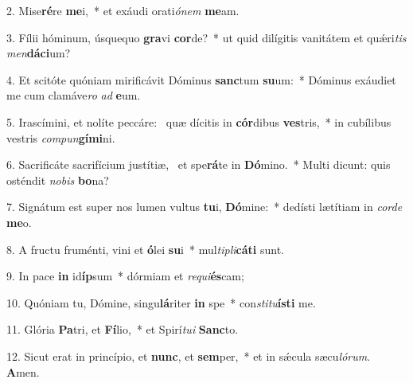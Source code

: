 2. Mise\textbf{ré}re \textbf{me}i,~*  et exáudi orati\textit{ó}\textit{nem} \textbf{me}am.\

3. Fílii hóminum, úsquequo \textbf{gra}vi \textbf{cor}de?~*  ut quid dilígitis vanitátem et quǽri\textit{tis} \textit{men}\textbf{dá}\textbf{ci}um?\

4. Et scitóte quóniam mirificávit Dóminus \textbf{sanc}tum \textbf{su}um:~*  Dóminus exáudiet me cum clamáve\textit{ro} \textit{ad} \textbf{e}um.\

5. Irascímini, et nolíte peccáre: \dag\  quæ dícitis in \textbf{cór}dibus \textbf{ves}tris,~*  in cubílibus vestris \textit{com}\textit{pun}\textbf{gí}\textbf{mi}ni.\

6. Sacrificáte sacrifícium justítiæ, \dag\  et spe\textbf{rá}te in \textbf{Dó}mino.~*  Multi dicunt: quis osténdit \textit{no}\textit{bis} \textbf{bo}na?\

7. Signátum est super nos lumen vultus \textbf{tu}i, \textbf{Dó}mine:~*  dedísti lætítiam in \textit{cor}\textit{de} \textbf{me}o.\

8. A fructu fruménti, vini et \textbf{ó}lei \textbf{su}i~*  mul\textit{ti}\textit{pli}\textbf{cá}\textbf{ti} sunt.\

9. In pace \textbf{in} id\textbf{íp}sum~*  dórmiam et \textit{re}\textit{qui}\textbf{és}cam;\

10. Quóniam tu, Dómine, singu\textbf{lá}riter \textbf{in} spe~*  con\textit{sti}\textit{tu}\textbf{ís}\textbf{ti} me.\

11. Glória \textbf{Pa}tri, et \textbf{Fí}lio,~*  et Spirí\textit{tu}\textit{i} \textbf{Sanc}to.\

12. Sicut erat in princípio, et \textbf{nunc}, et \textbf{sem}per,~*  et in sǽcula sæcu\textit{ló}\textit{rum}. \textbf{A}men.\

